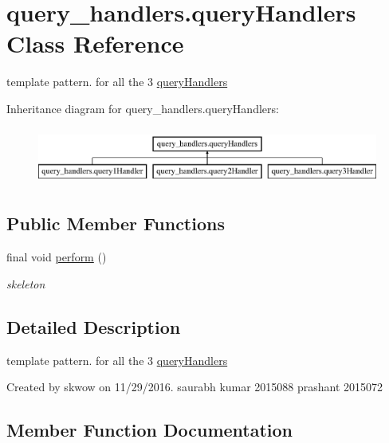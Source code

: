 \hypertarget{classquery__handlers_1_1query_handlers}{}\section{query\+\_\+handlers.\+query\+Handlers Class Reference}
\label{classquery__handlers_1_1query_handlers}


template pattern. for all the 3 \hyperlink{classquery__handlers_1_1query_handlers}{query\+Handlers}  


Inheritance diagram for query\+\_\+handlers.\+query\+Handlers\+:\begin{figure}[H]
\begin{center}
\leavevmode
\includegraphics[height=1.904762cm]{classquery__handlers_1_1query_handlers}
\end{center}
\end{figure}
\subsection*{Public Member Functions}
\begin{DoxyCompactItemize}
\item 
final void \hyperlink{classquery__handlers_1_1query_handlers_a2ffd93ab8225b054b72f8a99b45bed2f}{perform} ()
\begin{DoxyCompactList}\small\item\em skeleton \end{DoxyCompactList}\end{DoxyCompactItemize}


\subsection{Detailed Description}
template pattern. for all the 3 \hyperlink{classquery__handlers_1_1query_handlers}{query\+Handlers} 

Created by skwow on 11/29/2016. saurabh kumar 2015088 prashant 2015072 

\subsection{Member Function Documentation}
\hypertarget{classquery__handlers_1_1query_handlers_a2ffd93ab8225b054b72f8a99b45bed2f}{}\label{classquery__handlers_1_1query_handlers_a2ffd93ab8225b054b72f8a99b45bed2f} 
